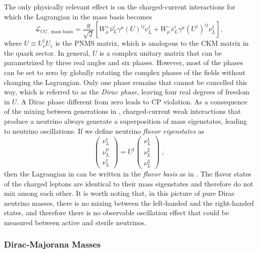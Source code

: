 The only physically relevant effect is on the charged-current interactions for which the Lagrangian in the mass basis becomes
\begin{equation}
    \mathcal{L}_\mathrm{CC,\;mass\;basis} = \frac{g}{\sqrt{2}}
    \left[
        W^+_\mu \bar{\nu}_L^i \gamma^\mu (U)^{ij} e_L^j
        + W^-_\mu \bar{e}_L^i \gamma^\mu (U^\dag)^{ij} \nu_L^j
    \right],\label{eq:lag-cc-mass-basis}
\end{equation}
where $U\equiv U_\nu^\dag U_e$ is the PNMS matrix, which is analogous to the CKM matrix in the quark sector.
In general, $U$ is a complex unitary matrix that can be parametrized by three real angles and six phases.
However, most of the phases can be set to zero by globally rotating the complex phases of the fields without changing the Lagrangian.
Only one phase remains that cannot be cancelled this way, which is referred to as the \emph{Dirac phase}, leaving four real degrees of freedom in $U$.
A Dirac phase different from zero leads to CP violation.
As a consequence of the mixing between generations in , charged-current weak interactions that produce a neutrino always generate a superposition of mass eigenstates, leading to neutrino oscillations.
If we define neutrino \emph{flavor eigenstates} as
\begin{equation}
    \begin{pmatrix}
        \nu_{L}^e \\
        \nu_{L}^\mu \\
        \nu_{L}^\tau
    \end{pmatrix}
    = U^\dag
    \begin{pmatrix}
        \nu_{L}^1 \\
        \nu_{L}^2 \\
        \nu_{L}^3
    \end{pmatrix}\;,
\end{equation}
then the Lagrangian in  can be written in the \emph{flavor basis} as in .
The flavor states of the charged leptons are identical to their mass eigenstates and therefore do not mix among each other.
It is worth noting that, in this picture of pure Dirac neutrino masses, there is no mixing between the left-handed and the right-handed states, and therefore there is no observable oscillation effect that could be measured between active and sterile neutrinos.

\subsubsection{Dirac-Majorana Masses}


